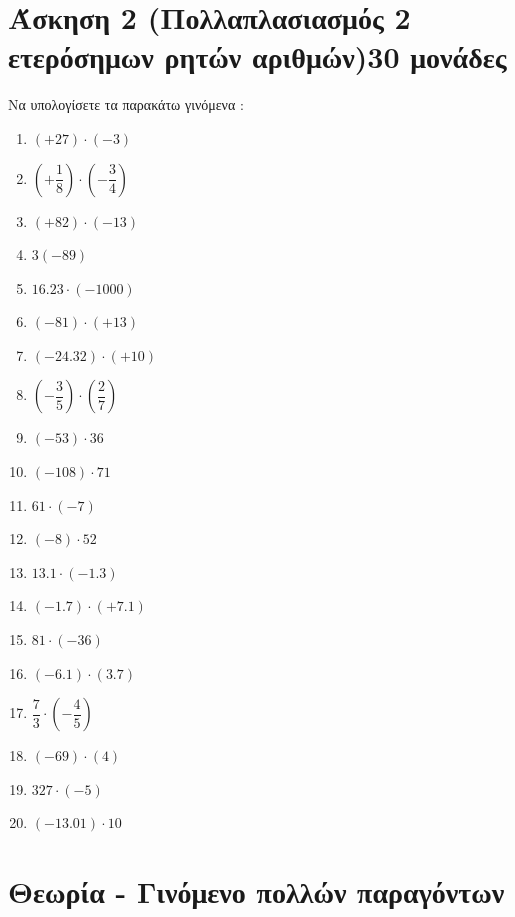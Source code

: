 \documentclass[a4paper,10pt]{report}
\begin{document}
\section*{Άσκηση 2  (Πολλαπλασιασμός 2 ετερόσημων ρητών αριθμών)\hfill \small{30 μονάδες}}
Να υπολογίσετε τα παρακάτω γινόμενα :
\begin{multicols}{2}
\begin{enumerate}[1)]
 \item $(+27)\cdot(-3)$
 \item $(+\dfrac{1}{8})\cdot(-\dfrac{3}{4})$
 \item $(+82)\cdot(-13)$
 \item $3(-89)$
 \item $16.23\cdot(-1000)$
 \item $(-81)\cdot(+13)$
 \item $(-24.32)\cdot(+10)$
 \item $(-\dfrac{3}{5})\cdot(\dfrac{2}{7})$
 \item $(-53)\cdot36$
 \item $(-108)\cdot71$
 \item $61\cdot(-7)$
 \item $(-8)\cdot52$
 \item $13.1\cdot(-1.3)$
 \item $(-1.7)\cdot(+7.1)$
 \item $81\cdot(-36)$
 \item $(-6.1)\cdot(3.7)$
 \item $\dfrac{7}{3}\cdot(-\dfrac{4}{5})$
 \item $(-69)\cdot(4)$
 \item $327\cdot(-5)$
 \item $(-13.01)\cdot10$
\end{enumerate}
\end{multicols}






\section*{Θεωρία - Γινόμενο πολλών παραγόντων \hfill \small{}}
\end{document}
